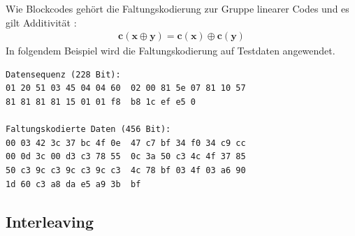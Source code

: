 Wie Blockcodes gehört die Faltungskodierung zur Gruppe linearer Codes und es gilt Additivität \citep[S. 142 ff.]{werner2008codierung}:
\begin{align}
\boldsymbol{c}(\boldsymbol{x} \oplus \boldsymbol{y}) = \boldsymbol{c}(\boldsymbol{x}) \oplus \boldsymbol{c}(\boldsymbol{y})
\end{align}
In folgendem Beispiel wird die Faltungskodierung auf Testdaten angewendet.\\

\begin{lstlisting}[caption={[Faltungskodierung von Testdaten]Faltungskodierung von Testdaten, Datensatz generiert mit \texttt{dummycoder} (siehe \autoref{hdl:coder-impl})}, label=lst:conv_code_data, captionpos=b, language=bytetxt, numbers=none, frame=single]
Datensequenz (228 Bit):
01 20 51 03 45 04 04 60  02 00 81 5e 07 81 10 57 
81 81 81 81 15 01 01 f8  b8 1c ef e5 0

Faltungskodierte Daten (456 Bit): 
00 03 42 3c 37 bc 4f 0e  47 c7 bf 34 f0 34 c9 cc 
00 0d 3c 00 d3 c3 78 55  0c 3a 50 c3 4c 4f 37 85 
50 c3 9c c3 9c c3 9c c3  4c 78 bf 03 4f 03 a6 90 
1d 60 c3 a8 da e5 a9 3b  bf 
\end{lstlisting}

\subsection{Interleaving}\label{hdl:interleaving}

